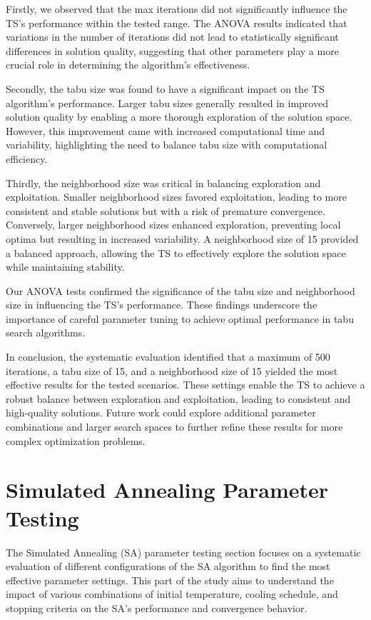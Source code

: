 \documentclass[
]{article}
\begin{document}
    Firstly, we observed that the max iterations did not significantly influence the TS’s performance within the tested range. The ANOVA results indicated that variations in the number of iterations did not lead to statistically significant differences in solution quality, suggesting that other parameters play a more crucial role in determining the algorithm's effectiveness.

    Secondly, the tabu size was found to have a significant impact on the TS algorithm's performance. Larger tabu sizes generally resulted in improved solution quality by enabling a more thorough exploration of the solution space. However, this improvement came with increased computational time and variability, highlighting the need to balance tabu size with computational efficiency.

    Thirdly, the neighborhood size was critical in balancing exploration and exploitation. Smaller neighborhood sizes favored exploitation, leading to more consistent and stable solutions but with a risk of premature convergence. Conversely, larger neighborhood sizes enhanced exploration, preventing local optima but resulting in increased variability. A neighborhood size of 15 provided a balanced approach, allowing the TS to effectively explore the solution space while maintaining stability.

    Our ANOVA tests confirmed the significance of the tabu size and neighborhood size in influencing the TS’s performance. These findings underscore the importance of careful parameter tuning to achieve optimal performance in tabu search algorithms.

    In conclusion, the systematic evaluation identified that a maximum of 500 iterations, a tabu size of 15, and a neighborhood size of 15 yielded the most effective results for the tested scenarios. These settings enable the TS to achieve a robust balance between exploration and exploitation, leading to consistent and high-quality solutions. Future work could explore additional parameter combinations and larger search spaces to further refine these results for more complex optimization problems.


    \newpage


    \section{Simulated Annealing Parameter Testing}

    The Simulated Annealing (SA) parameter testing section focuses on a systematic evaluation of different configurations of the SA algorithm to find the most effective parameter settings.
    This part of the study aims to understand the impact of various combinations of initial temperature, cooling schedule, and stopping criteria on the SA’s performance and convergence behavior.
\end{document}
